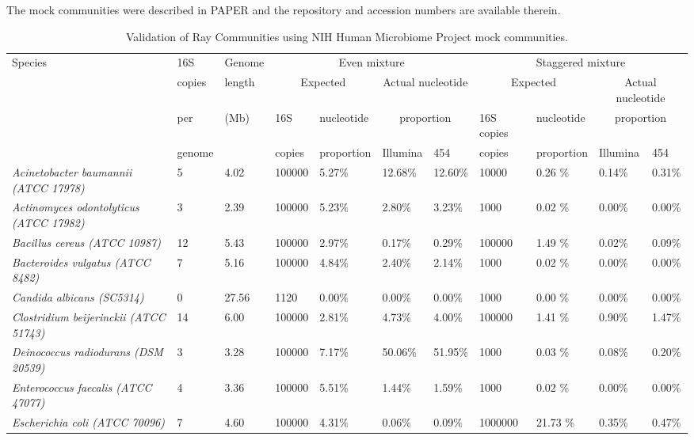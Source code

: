 \documentclass{article}
\begin{document}
\begin{landscape}
\begin{table}
\caption{Validation of Ray Communities using NIH Human Microbiome Project mock communities.}
The mock communities were described in PAPER and the repository and accession numbers are available therein.\\
\label{TableMocks}
\begin{tabular}{lllllllllll}
\hline
Species & 16S& Genome &  \multicolumn{4}{c}{Even mixture} &  \multicolumn{4}{c}{Staggered mixture} \\
 &copies & length & \multicolumn{2}{c}{Expected} & \multicolumn{2}{c}{Actual nucleotide} & \multicolumn{2}{c}{Expected} & \multicolumn{2}{c}{Actual nucleotide}  \\
       & per & (Mb) & 16S & nucleotide & \multicolumn{2}{c}{proportion} & 16S copies & nucleotide & \multicolumn{2}{c}{proportion}   \\
 & genome &  & copies & proportion & Illumina& 454 & copies & proportion & Illumina & 454 \\
\hline
\textit{Acinetobacter baumannii (ATCC 17978)} & 5 & 4.02  & 100000 & 5.27\% & 12.68\% &  12.60\% & 10000 & 0.26 \%   & 0.14\%  & 0.31\% \\
\textit{Actinomyces odontolyticus (ATCC 17982)} & 3 & 2.39  & 100000 & 5.23\% & 2.80\% &  3.23\% & 1000 & 0.02 \%   & 0.00\%  & 0.00\% \\
\textit{Bacillus cereus (ATCC 10987)} & 12 & 5.43  & 100000 & 2.97\% & 0.17\% &  0.29\% & 100000 & 1.49 \%   & 0.02\%  & 0.09\% \\
\textit{Bacteroides vulgatus (ATCC 8482)} & 7 & 5.16  & 100000 & 4.84\% & 2.40\% &  2.14\% & 1000 & 0.02 \%   & 0.00\%  & 0.00\% \\
\textit{Candida albicans (SC5314)} & 0 & 27.56  & 1120 & 0.00\% & 0.00\% &  0.00\% & 1000 & 0.00 \%   & 0.00\%  & 0.00\% \\
\textit{Clostridium beijerinckii (ATCC 51743)} & 14 & 6.00  & 100000 & 2.81\% & 4.73\% &  4.00\% & 100000 & 1.41 \%   & 0.90\%  & 1.47\% \\
\textit{Deinococcus radiodurans (DSM 20539)} & 3 & 3.28  & 100000 & 7.17\% & 50.06\% &  51.95\% & 1000 & 0.03 \%   & 0.08\%  & 0.20\% \\
\textit{Enterococcus faecalis (ATCC 47077)} & 4 & 3.36  & 100000 & 5.51\% & 1.44\% &  1.59\% & 1000 & 0.02 \%   & 0.00\%  & 0.00\% \\
\textit{Escherichia coli (ATCC 70096)} & 7 & 4.60  & 100000 & 4.31\% & 0.06\% &  0.09\% & 1000000 & 21.73 \%   & 0.35\%  & 0.47\% \\

\end{tabular}
\end{table}
\end{landscape}
\end{document}
